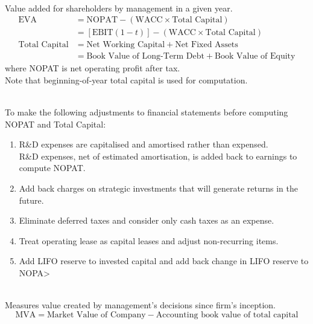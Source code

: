 \begin{definition} \\
Value added for shareholders by management in a given year.
\begin{align}
\text{EVA} &= \text{NOPAT} - (\text{WACC} \times \text{Total Capital}) \nonumber \\
&= [\text{EBIT}(1-t)] - (\text{WACC} \times \text{Total Capital}) \nonumber \\
\text{Total Capital} &= \text{Net Working Capital} + \text{Net Fixed Assets} \nonumber \\
&= \text{Book Value of Long-Term Debt} + \text{Book Value of Equity} \nonumber
\end{align}
where NOPAT is net operating profit after tax.\\
Note that beginning-of-year total capital is used for computation.
\end{definition}

\begin{remark} \\
To make the following adjustments to financial statements before computing NOPAT and Total Capital:
\begin{enumerate}[label=\roman*.]
\setlength{\itemsep}{0pt}
\item R\&D expenses are capitalised and amortised rather than expensed.\\
R\&D expenses, net of estimated amortisation, is added back to earnings to compute NOPAT.
\item Add back charges on strategic investments that will generate returns in the future.
\item Eliminate deferred taxes and consider only cash taxes as an expense.
\item Treat operating lease as capital leases and adjust non-recurring items.
\item Add LIFO reserve to invested capital and add back change in LIFO reserve to NOPA>
\end{enumerate}
\end{remark}

\begin{definition} \\
Measures value created by management's decisions since firm's inception.
\begin{equation}
\text{MVA} = \text{Market Value of Company} - \text{Accounting book value of total capital} \nonumber
\end{equation}
\end{definition}

